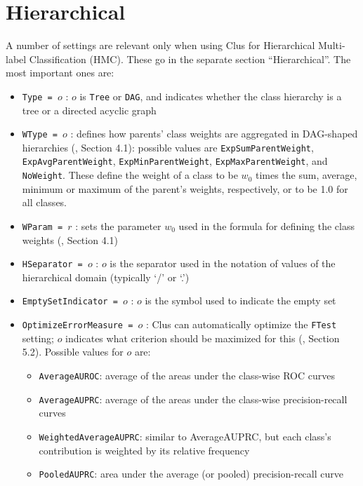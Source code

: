 \documentclass[a4paper]{report}
\begin{document}
\section{Hierarchical}

A number of settings are relevant only when using Clus for Hierarchical Multi-label Classification (HMC).  These go in the separate section ``Hierarchical''.  The most important ones are:

\begin{itemize}
\item {\tt Type = $o$} : $o$ is {\tt Tree} or {\tt DAG}, and indicates whether the class hierarchy is a tree or a directed acyclic graph \cite{Vens08:jrnl}
\item {\tt WType = $o$} : defines how parents' class weights are aggregated in DAG-shaped hierarchies (\cite{Vens08:jrnl}, Section 4.1): possible values are {\tt ExpSumParentWeight}, {\tt ExpAvgParentWeight}, {\tt ExpMinParentWeight}, {\tt ExpMaxParentWeight}, and {\tt NoWeight}.  These define the weight of a class to be $w_0$ times the sum, average, minimum or maximum of the parent's weights, respectively, or to be 1.0 for all classes. 
\item {\tt WParam = $r$} : sets the parameter $w_0$ used in the formula for defining the class weights (\cite{Vens08:jrnl}, Section 4.1)
\item {\tt HSeparator = $o$} : $o$ is the separator used in the notation of values of the hierarchical domain (typically `/' or `.') 
\item {\tt EmptySetIndicator = $o$} : $o$ is the symbol used to indicate the empty set
\item {\tt OptimizeErrorMeasure = $o$} : Clus can automatically optimize the {\tt FTest} setting; $o$ indicates what criterion should be maximized for this (\cite{Vens08:jrnl}, Section 5.2).  Possible values for $o$ are:
  \begin{itemize}
   \item {\tt AverageAUROC}: average of the areas under the class-wise ROC curves
   \item {\tt AverageAUPRC}: average of the areas under the class-wise precision-recall curves
   \item {\tt WeightedAverageAUPRC}: similar to AverageAUPRC, but each class's contribution is                         weighted by its relative frequency
   \item {\tt PooledAUPRC}: area under the average (or pooled) precision-recall curve
  \end{itemize}

\end{itemize}
\end{document}
